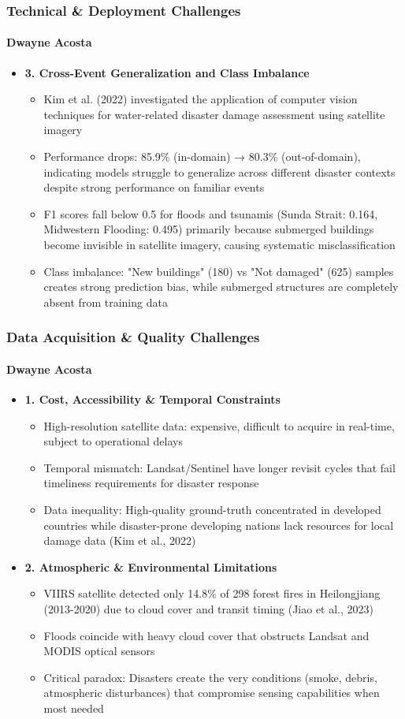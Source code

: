 \documentclass{beamer}
\newcommand{\namedframe}[3]{
  \begin{frame}
    \frametitle{#2}
    \framesubtitle{#1}
    #3
  \end{frame}
}
\begin{document}
\namedframe{Dwayne Acosta}{Technical \& Deployment Challenges}{
\begin{itemize}
    \item \textbf{3. Cross-Event Generalization and Class Imbalance}
    \begin{itemize}
      \item Kim et al. (2022) investigated the application of computer vision techniques for water-related disaster damage assessment using satellite imagery
      \item Performance drops: 85.9\% (in-domain) → 80.3\% (out-of-domain), indicating models struggle to generalize across different disaster contexts despite strong performance on familiar events
      \item F1 scores fall below 0.5 for floods and tsunamis (Sunda Strait: 0.164, Midwestern Flooding: 0.495) primarily because submerged buildings become invisible in satellite imagery, causing systematic misclassification
      \item Class imbalance: "New buildings" (180) vs "Not damaged" (625) samples creates strong prediction bias, while submerged structures are completely absent from training data
    \end{itemize}
\end{itemize}
}


\namedframe{Dwayne Acosta}{Data Acquisition \& Quality Challenges}{
\begin{itemize}
    \item \textbf{1. Cost, Accessibility \& Temporal Constraints}
    \begin{itemize}
        \item High-resolution satellite data: expensive, difficult to acquire in real-time, subject to operational delays
        \item Temporal mismatch: Landsat/Sentinel have longer revisit cycles that fail timeliness requirements for disaster response
        \item Data inequality: High-quality ground-truth concentrated in developed countries while disaster-prone developing nations lack resources for local damage data (Kim et al., 2022)
    \end{itemize}
    
    \item \textbf{2. Atmospheric \& Environmental Limitations}
    \begin{itemize}
        \item VIIRS satellite detected only 14.8\% of 298 forest fires in Heilongjiang (2013-2020) due to cloud cover and transit timing (Jiao et al., 2023)
        \item Floods coincide with heavy cloud cover that obstructs Landsat and MODIS optical sensors
        \item Critical paradox: Disasters create the very conditions (smoke, debris, atmospheric disturbances) that compromise sensing capabilities when most needed
    \end{itemize}
\end{itemize}
}
\end{document}
